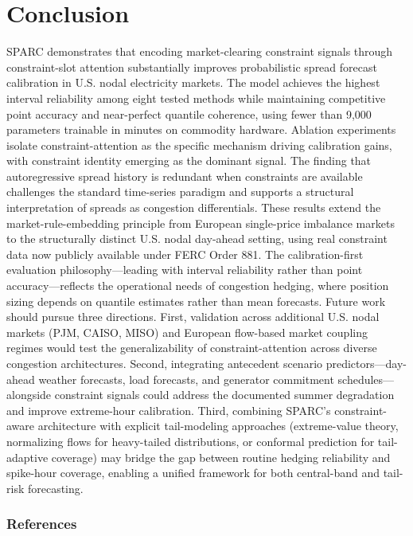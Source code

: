 \documentclass[twoside]{article}
\begin{document}
\section{Conclusion}
SPARC demonstrates that encoding market-clearing constraint signals through constraint-slot attention substantially improves probabilistic spread forecast calibration in U.S. nodal electricity markets. The model achieves the highest interval reliability among eight tested methods while maintaining competitive point accuracy and near-perfect quantile coherence, using fewer than 9,000 parameters trainable in minutes on commodity hardware. Ablation experiments isolate constraint-attention as the specific mechanism driving calibration gains, with constraint identity emerging as the dominant signal. The finding that autoregressive spread history is redundant when constraints are available challenges the standard time-series paradigm and supports a structural interpretation of spreads as congestion differentials.
These results extend the market-rule-embedding principle from European single-price imbalance markets to the structurally distinct U.S. nodal day-ahead setting, using real constraint data now publicly available under FERC Order 881. The calibration-first evaluation philosophy---leading with interval reliability rather than point accuracy---reflects the operational needs of congestion hedging, where position sizing depends on quantile estimates rather than mean forecasts.
Future work should pursue three directions. First, validation across additional U.S. nodal markets (PJM, CAISO, MISO) and European flow-based market coupling regimes would test the generalizability of constraint-attention across diverse congestion architectures. Second, integrating antecedent scenario predictors---day-ahead weather forecasts, load forecasts, and generator commitment schedules---alongside constraint signals could address the documented summer degradation and improve extreme-hour calibration. Third, combining SPARC's constraint-aware architecture with explicit tail-modeling approaches (extreme-value theory, normalizing flows for heavy-tailed distributions, or conformal prediction for tail-adaptive coverage) may bridge the gap between routine hedging reliability and spike-hour coverage, enabling a unified framework for both central-band and tail-risk forecasting.

\subsubsection*{References}
\small

\end{document}
